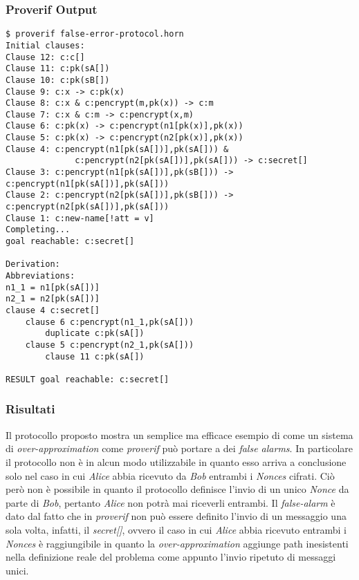 \documentclass[11pt]{article}
\begin{document}
\subsubsection{Proverif Output}
\label{sec:orgf1d3299}
\begin{verbatim}
$ proverif false-error-protocol.horn
Initial clauses:
Clause 12: c:c[]
Clause 11: c:pk(sA[])
Clause 10: c:pk(sB[])
Clause 9: c:x -> c:pk(x)
Clause 8: c:x & c:pencrypt(m,pk(x)) -> c:m
Clause 7: c:x & c:m -> c:pencrypt(x,m)
Clause 6: c:pk(x) -> c:pencrypt(n1[pk(x)],pk(x))
Clause 5: c:pk(x) -> c:pencrypt(n2[pk(x)],pk(x))
Clause 4: c:pencrypt(n1[pk(sA[])],pk(sA[])) &
              c:pencrypt(n2[pk(sA[])],pk(sA[])) -> c:secret[]
Clause 3: c:pencrypt(n1[pk(sA[])],pk(sB[])) -> c:pencrypt(n1[pk(sA[])],pk(sA[]))
Clause 2: c:pencrypt(n2[pk(sA[])],pk(sB[])) -> c:pencrypt(n2[pk(sA[])],pk(sA[]))
Clause 1: c:new-name[!att = v]
Completing...
goal reachable: c:secret[]

Derivation:
Abbreviations:
n1_1 = n1[pk(sA[])]
n2_1 = n2[pk(sA[])]
clause 4 c:secret[]
    clause 6 c:pencrypt(n1_1,pk(sA[]))
        duplicate c:pk(sA[])
    clause 5 c:pencrypt(n2_1,pk(sA[]))
        clause 11 c:pk(sA[])

RESULT goal reachable: c:secret[]
\end{verbatim}
\subsubsection{Risultati}
\label{sec:org526b6a7}
Il protocollo proposto mostra un semplice ma efficace esempio di come un sistema di \emph{over-approximation} come \emph{proverif} può portare a dei \emph{false alarms}.
In particolare il protocollo non è in alcun modo utilizzabile in quanto esso arriva a conclusione solo nel caso in cui \emph{Alice} abbia ricevuto da \emph{Bob} entrambi i \emph{Nonces} cifrati.
Ciò però non è possibile in quanto il protocollo definisce l'invio di un unico \emph{Nonce} da parte di \emph{Bob}, pertanto \emph{Alice} non potrà mai riceverli entrambi.
Il \emph{false-alarm} è dato dal fatto che in \emph{proverif} non può essere definito l'invio di un messaggio una sola volta, infatti, il \emph{secret[]}, ovvero il caso in cui \emph{Alice} abbia ricevuto entrambi i \emph{Nonces} è raggiungibile in quanto la \emph{over-approximation} aggiunge path inesistenti nella definizione reale del problema come appunto l'invio ripetuto di messaggi unici.
\end{document}
